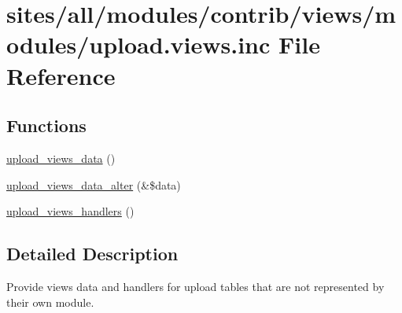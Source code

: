 \hypertarget{upload_8views_8inc}{
\section{sites/all/modules/contrib/views/modules/upload.views.inc File Reference}
\label{upload_8views_8inc}
}
\subsection*{Functions}
\begin{CompactItemize}
\item 
\hyperlink{group__views__upload__module_ga4924ec055335adab5d50803f2355a62}{upload\_\-views\_\-data} ()
\item 
\hyperlink{group__views__upload__module_gd15600528a5078578b1cc7ebe5e4e210}{upload\_\-views\_\-data\_\-alter} (\&\$data)
\item 
\hyperlink{group__views__upload__module_gc45654d1a172945c169b1bdbf317b3ee}{upload\_\-views\_\-handlers} ()
\end{CompactItemize}


\subsection{Detailed Description}
Provide views data and handlers for upload tables that are not represented by their own module. 